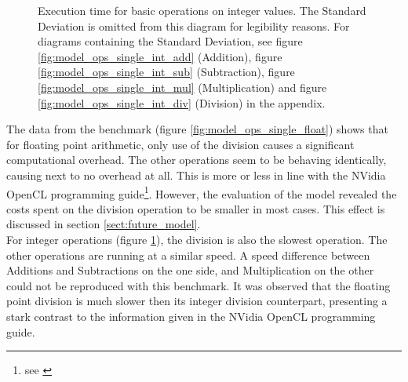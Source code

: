 \begin{figure}[p]
	\begin{center}
		\caption{Execution time for basic operations on integer values. The Standard Deviation is omitted from this diagram for legibility reasons. For diagrams containing the Standard Deviation, see figure \ref{fig:model_ops_single_int_add} (Addition), figure \ref{fig:model_ops_single_int_sub} (Subtraction), figure \ref{fig:model_ops_single_int_mul} (Multiplication) and figure \ref{fig:model_ops_single_int_div} (Division) in the appendix.}
		\label{fig:model_ops_single_int}
	\end{center}
\end{figure}

The data from the benchmark (figure \ref{fig:model_ops_single_float}) shows that for floating point arithmetic, only use of the division causes a significant computational overhead. The other operations seem to be behaving identically, causing next to no overhead at all. This is more or less in line with the NVidia OpenCL programming guide\footnote{see \cite{nvidia2009opencl}}. However, the evaluation of the model revealed the costs spent on the division operation to be smaller in most cases. This effect is discussed in section \ref{sect:future_model}.\\ 

For integer operations (figure \ref{fig:model_ops_single_int}), the division is also the slowest operation. The other operations are running at a similar speed. A speed difference between Additions and Subtractions on the one side, and Multiplication on the other could not be reproduced with this benchmark. It was observed that the floating point division is much slower then its integer division counterpart, presenting a stark contrast to the information given in the NVidia OpenCL programming guide. \\

